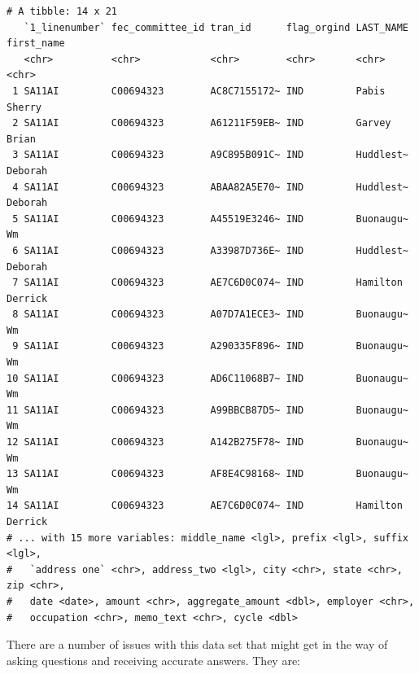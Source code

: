 \documentclass[
  letterpaper,
  DIV=11,
  numbers=noendperiod]{scrreprt}
\begin{document}
\begin{verbatim}
# A tibble: 14 x 21
   `1_linenumber` fec_committee_id tran_id      flag_orgind LAST_NAME first_name
   <chr>          <chr>            <chr>        <chr>       <chr>     <chr>     
 1 SA11AI         C00694323        AC8C7155172~ IND         Pabis     Sherry    
 2 SA11AI         C00694323        A61211F59EB~ IND         Garvey    Brian     
 3 SA11AI         C00694323        A9C895B091C~ IND         Huddlest~ Deborah   
 4 SA11AI         C00694323        ABAA82A5E70~ IND         Huddlest~ Deborah   
 5 SA11AI         C00694323        A45519E3246~ IND         Buonaugu~ Wm        
 6 SA11AI         C00694323        A33987D736E~ IND         Huddlest~ Deborah   
 7 SA11AI         C00694323        AE7C6D0C074~ IND         Hamilton  Derrick   
 8 SA11AI         C00694323        A07D7A1ECE3~ IND         Buonaugu~ Wm        
 9 SA11AI         C00694323        A290335F896~ IND         Buonaugu~ Wm        
10 SA11AI         C00694323        AD6C11068B7~ IND         Buonaugu~ Wm        
11 SA11AI         C00694323        A99BBCB87D5~ IND         Buonaugu~ Wm        
12 SA11AI         C00694323        A142B275F78~ IND         Buonaugu~ Wm        
13 SA11AI         C00694323        AF8E4C98168~ IND         Buonaugu~ Wm        
14 SA11AI         C00694323        AE7C6D0C074~ IND         Hamilton  Derrick   
# ... with 15 more variables: middle_name <lgl>, prefix <lgl>, suffix <lgl>,
#   `address one` <chr>, address_two <lgl>, city <chr>, state <chr>, zip <chr>,
#   date <date>, amount <chr>, aggregate_amount <dbl>, employer <chr>,
#   occupation <chr>, memo_text <chr>, cycle <dbl>
\end{verbatim}

There are a number of issues with this data set that might get in the
way of asking questions and receiving accurate answers. They are:
\end{document}
